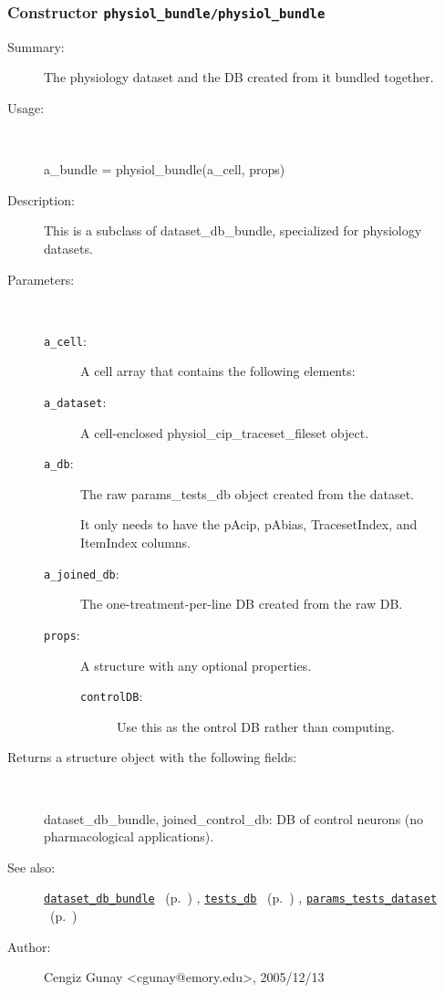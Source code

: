 \subsubsection[Constructor \texttt{physiol\_bundle}]{Constructor \texttt{physiol\_bundle/physiol\_bundle}}%
%
\label{ref_physiol_bundle__physiol_bundle}%
\hypertarget{ref_physiol_bundle__physiol_bundle}{}%
\begin{description}
\item[Summary:]The physiology dataset and the DB created from it bundled together.
%
\item[Usage:]~%
\begin{lyxcode}%
a\_bundle = physiol\_bundle(a\_cell, props)
%
\end{lyxcode}%
%
\item[Description:]%
This is a subclass of dataset\_db\_bundle, specialized for physiology datasets. 
\item[Parameters:]~
\begin{description}%
\item[\texttt{a\_cell}:]
 A cell array that contains the following elements:
\item[\texttt{a\_dataset}:]
 A cell-enclosed physiol\_cip\_traceset\_fileset object.
\item[\texttt{a\_db}:]
 The raw params\_tests\_db object created from the dataset. 

It only needs to have the pAcip, pAbias, TracesetIndex, and ItemIndex columns.
\item[\texttt{a\_joined\_db}:]
 The one-treatment-per-line DB created from the raw DB.
\item[\texttt{props}:]
 A structure with any optional properties.
\begin{description}%
\item[\texttt{controlDB}:]
 Use this as the ontrol DB rather than computing.
\end{description}%
\end{description}%
%
\item[Returns a structure object with the following fields:
]~

	dataset\_db\_bundle, 
	joined\_control\_db: DB of control neurons (no pharmacological applications).
%
%
\item[See also:]%
\hyperlink{ref_dataset_db_bundle}{\texttt{dataset\_db\_bundle}}%
\ (p.~\pageref{ref_dataset_db_bundle})%
%
, \hyperlink{ref_tests_db}{\texttt{tests\_db}}%
\ (p.~\pageref{ref_tests_db})%
%
, \hyperlink{ref_params_tests_dataset}{\texttt{params\_tests\_dataset}}%
\ (p.~\pageref{ref_params_tests_dataset})%
%
%
\item[Author:]%
Cengiz Gunay <cgunay@emory.edu>, 2005/12/13
%
\end{description}
\methodline%
